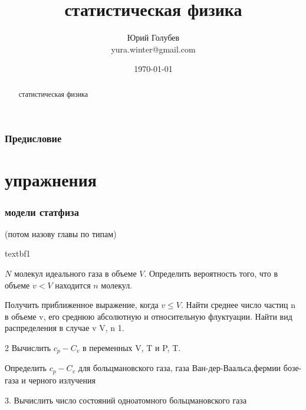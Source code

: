\documentclass[a4paper,12pt]{article} %
\author{Юрий Голубев\\ yura.winter@gmail.com }
\title{статистическая физика}
\date{\today}
\begin{document}
\maketitle

\begin{abstract}
статистическая физика
\end{abstract}
\tableofcontents

\section*{Предисловие}




\clearpage
\part{упражнения}

\section{модели статфиза}

(потом назову главы по типам)

\begin{task}textbf{1}

$ N $ молекул идеального газа в объеме $ V $. Определить вероятность того, что в объеме $v < V$ находится $ n $ молекул.

Получить приближенное выражение, когда  $v \le V $. 
Найти среднее число частиц n в объеме v, его среднюю абсолютную и относительную флуктуации. Найти вид распределения в случае v V, n  1. 


\end{task}


\begin{task}

2
Вычислить $ c_p-C_v$ в  переменных V, T и P, T. 

Определить $ c_p-C_v$ для больцмановского газа,
газа Ван-дер-Ваальса,фермии бозе-газа и черного излучения


\end{task}


\begin{task}

3. Вычислить число состояний одноатомного больцмановского газа


\end{task}
\end{document}

